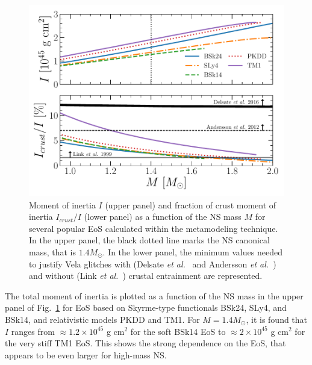 \begin{figure}[!t]
\begin{center}
  \includegraphics[width=0.9\linewidth]{figures/moi_popular.pdf}
\end{center}
\caption[Moment of inertia and fraction of crust moment of inertia
versus neutron star mass for several popular equations of state]{Moment of
  inertia $I$ (upper panel) and fraction of crust moment of inertia
  $I_{crust}/I$ (lower panel) as a function of the NS mass $M$ for several 
  popular EoS calculated within the metamodeling technique. In the upper panel, 
  the black dotted line marks the NS canonical mass, that is $1.4M_\odot$. In
the lower panel, the minimum values needed to justify Vela glitches with
(Delsate \textit{et al.}~\cite{Delsate2016} and Andersson \textit{et
al.}~\cite{Andersson2012}) and without (Link \textit{et al.}~\cite{Link1999}) 
crustal entrainment are represented.}\label{fig:moi_popular}
\end{figure}

The total moment of inertia is plotted as a function of the NS mass in the
upper panel of Fig.~\ref{fig:moi_popular} for EoS based on Skyrme-type
functionals BSk24, SLy4, and BSk14, and relativistic models PKDD and TM1.
For $M=1.4M_\odot$, it is found that $I$ ranges from $\approx 1.2\times 
10^{45}$ g cm$^2$ for the soft BSk14 EoS to $\approx 2\times 10^{45}$ g cm$^2$ 
for the very stiff TM1 EoS. This shows the strong dependence on the EoS, 
{that appears to be even larger for high-mass NS.}

